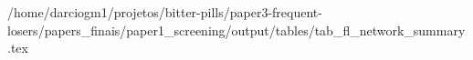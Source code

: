 /home/darciogm1/projetos/bitter-pills/paper3-frequent-losers/papers_finais/paper1_screening/output/tables/tab_fl_network_summary.tex